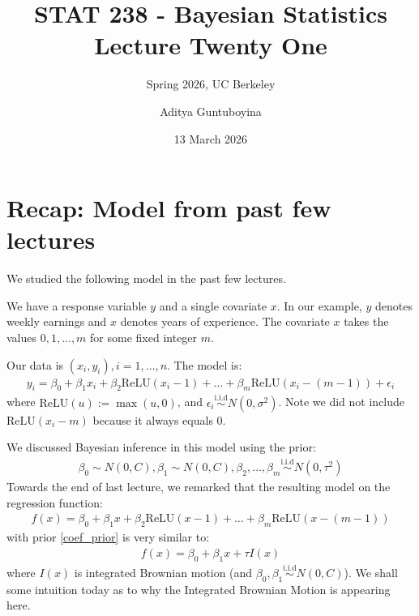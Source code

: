 \documentclass{scrartcl}
\newcommand{\relu}{{\text{ReLU}}}
\begin{document}
\title{STAT 238 - Bayesian Statistics  \\
  Lecture Twenty One} 
\subtitle{Spring 2026, UC Berkeley}

\author{Aditya Guntuboyina}


\date{13 March 2026}

\maketitle

\section{Recap: Model from past few lectures}

We studied the following model in the past few lectures.

We have a response variable $y$ and a single covariate $x$. In our
example, $y$ denotes weekly earnings and $x$ denotes years of
experience. The covariate $x$ takes the values $0, 1, \dots, m$ for
some fixed integer $m$. 

Our data is $(x_i, y_i), i = 1, \dots, n$. The model is:
\begin{align}\label{disc_mod}
  y_i = \beta_0 + \beta_1 x_i + \beta_2 \relu(x_i - 1) + \dots +
  \beta_{m}\relu(x_i - (m-1)) + \epsilon_i
\end{align}
where $\relu(u) := \max(u, 0)$, and $\epsilon_i
\overset{\text{i.i.d}}{\sim} N(0, \sigma^2)$. Note we did not include
$\relu(x_i - m)$ because it always equals 0.

We discussed Bayesian inference in this model using the prior: 
\begin{align}\label{coef_prior}
  \beta_0 \sim N(0, C), \beta_1 \sim N(0, C), \beta_2, \dots, \beta_m
  \overset{\text{i.i.d}}{\sim} N(0, \tau^2)
\end{align}
Towards the end of last lecture, we remarked that the resulting model
on the regression function: 
\begin{align*}
  f(x) = \beta_0 + \beta_1 x + \beta_2 \relu(x - 1) + \dots +
  \beta_{m}\relu(x - (m-1))
\end{align*}
with prior \eqref{coef_prior} is very similar to:
\begin{align}\label{ibm_mod}
  f(x) = \beta_0 + \beta_1 x + \tau I(x)
\end{align}
where $I(x)$ is integrated Brownian motion (and $\beta_0, \beta_1
\overset{\text{i.i.d}}{\sim} N(0, C)$). We shall some intuition today
as to why the Integrated Brownian Motion is appearing here. 
\end{document}
